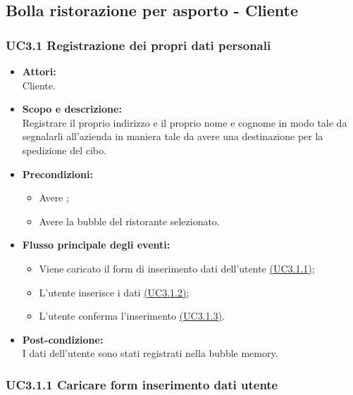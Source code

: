 \subsection{Bolla ristorazione per asporto - Cliente}

\subsubsection{UC3.1 Registrazione dei propri dati personali } \label{UC3.1}

\begin{itemize}
	\item \textbf{Attori:}
	\\Cliente.
	\item \textbf{Scopo e descrizione:} 
	\\Registrare il proprio indirizzo e il proprio nome e cognome in modo tale da segnalarli all’azienda in maniera tale da avere una destinazione per la spedizione del cibo.
	\item \textbf{Precondizioni:}
	\begin{itemize}
		\item Avere ;
		\item Avere la bubble del ristorante selezionato.
	\end{itemize}
	\item \textbf{Flusso principale degli eventi:}
	\begin{itemize}
		\item Viene caricato il form di inserimento dati dell’utente \hyperref[UC3.1.1]{(UC3.1.1)};
		\item L’utente inserisce i dati \hyperref[UC3.1.2]{(UC3.1.2)};
		\item L’utente conferma l’inserimento \hyperref[UC3.1.3]{(UC3.1.3)}.
	\end{itemize}
	\item \textbf{Post-condizione:}
	\\I dati dell’utente sono stati registrati nella bubble memory.
\end{itemize}

\subsubsection{UC3.1.1 Caricare form inserimento dati utente} \label{UC3.1.1}

